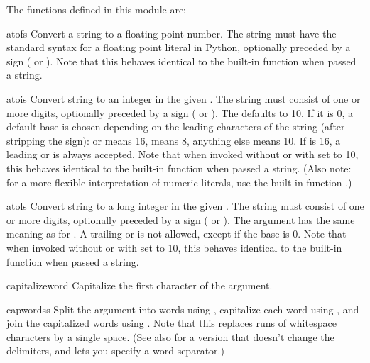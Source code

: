 The functions defined in this module are:

\renewcommand{\indexsubitem}{(in module string)}

\begin{funcdesc}{atof}{s}
Convert a string to a floating point number.  The string must have
the standard syntax for a floating point literal in Python, optionally
preceded by a sign (\samp{+} or \samp{-}).  Note that this behaves
identical to the built-in function  when passed a string.
\end{funcdesc}

\begin{funcdesc}{atoi}{s}
Convert string  to an integer in the given .  The
string must consist of one or more digits, optionally preceded by a
sign (\samp{+} or \samp{-}).  The  defaults to 10.  If it is
0, a default base is chosen depending on the leading characters of the
string (after stripping the sign):  or  means 16,
 means 8, anything else means 10.  If  is 16, a
leading  or  is always accepted.  Note that when
invoked without  or with  set to 10, this behaves
identical to the built-in function  when passed a string.
(Also note: for a more flexible interpretation of numeric literals,
use the built-in function .)
\end{funcdesc}

\begin{funcdesc}{atol}{s}
Convert string  to a long integer in the given .  The
string must consist of one or more digits, optionally preceded by a
sign (\samp{+} or \samp{-}).  The  argument has the same
meaning as for .  A trailing  or  is not
allowed, except if the base is 0.  Note that when invoked without
 or with  set to 10, this behaves identical to the
built-in function  when passed a string.
\end{funcdesc}

\begin{funcdesc}{capitalize}{word}
Capitalize the first character of the argument.
\end{funcdesc}

\begin{funcdesc}{capwords}{s}
Split the argument into words using , capitalize each word
using , and join the capitalized words using
.  Note that this replaces runs of whitespace characters by
a single space.  (See also  for a version
that doesn't change the delimiters, and lets you specify a word
separator.)
\end{funcdesc}

